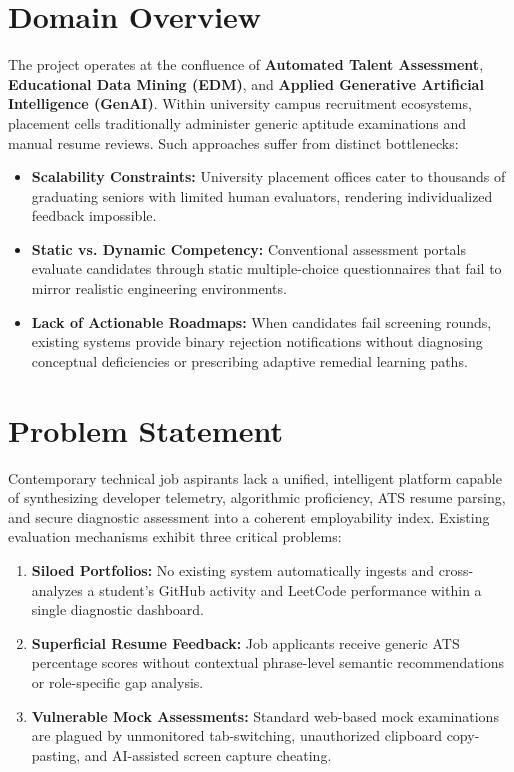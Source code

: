 \section{Domain Overview}
The project operates at the confluence of \textbf{Automated Talent Assessment}, \textbf{Educational Data Mining (EDM)}, and \textbf{Applied Generative Artificial Intelligence (GenAI)}. Within university campus recruitment ecosystems, placement cells traditionally administer generic aptitude examinations and manual resume reviews. Such approaches suffer from distinct bottlenecks:
\begin{itemize}
    \item \textbf{Scalability Constraints:} University placement offices cater to thousands of graduating seniors with limited human evaluators, rendering individualized feedback impossible.
    \item \textbf{Static vs. Dynamic Competency:} Conventional assessment portals evaluate candidates through static multiple-choice questionnaires that fail to mirror realistic engineering environments.
    \item \textbf{Lack of Actionable Roadmaps:} When candidates fail screening rounds, existing systems provide binary rejection notifications without diagnosing conceptual deficiencies or prescribing adaptive remedial learning paths.
\end{itemize}

\section{Problem Statement}
Contemporary technical job aspirants lack a unified, intelligent platform capable of synthesizing developer telemetry, algorithmic proficiency, ATS resume parsing, and secure diagnostic assessment into a coherent employability index. Existing evaluation mechanisms exhibit three critical problems:
\begin{enumerate}
    \item \textbf{Siloed Portfolios:} No existing system automatically ingests and cross-analyzes a student's GitHub activity and LeetCode performance within a single diagnostic dashboard.
    \item \textbf{Superficial Resume Feedback:} Job applicants receive generic ATS percentage scores without contextual phrase-level semantic recommendations or role-specific gap analysis.
    \item \textbf{Vulnerable Mock Assessments:} Standard web-based mock examinations are plagued by unmonitored tab-switching, unauthorized clipboard copy-pasting, and AI-assisted screen capture cheating.
\end{enumerate}

